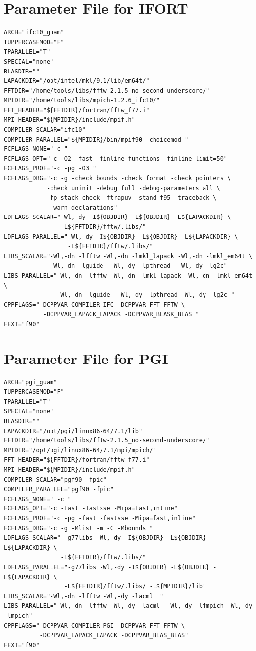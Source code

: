 \documentclass[a4paper,10pt]{report}
\begin{document}
\section{Parameter  File for IFORT}
\begin{verbatim}
ARCH="ifc10_guam"
TUPPERCASEMOD="F"
TPARALLEL="T"
SPECIAL="none"
BLASDIR=""
LAPACKDIR="/opt/intel/mkl/9.1/lib/em64t/"
FFTDIR="/home/tools/libs/fftw-2.1.5_no-second-underscore/"
MPIDIR="/home/tools/libs/mpich-1.2.6_ifc10/"
FFT_HEADER="${FFTDIR}/fortran/fftw_f77.i"
MPI_HEADER="${MPIDIR}/include/mpif.h"
COMPILER_SCALAR="ifc10"
COMPILER_PARALLEL="${MPIDIR}/bin/mpif90 -choicemod "
FCFLAGS_NONE="-c "
FCFLAGS_OPT="-c -O2 -fast -finline-functions -finline-limit=50"
FCFLAGS_PROF="-c -pg -O3 "
FCFLAGS_DBG="-c -g -check bounds -check format -check pointers \
            -check uninit -debug full -debug-parameters all \
            -fp-stack-check -ftrapuv -stand f95 -traceback \
             -warn declarations"
LDFLAGS_SCALAR="-Wl,-dy -I${OBJDIR} -L${OBJDIR} -L${LAPACKDIR} \
                -L${FFTDIR}/fftw/.libs/"
LDFLAGS_PARALLEL="-Wl,-dy -I${OBJDIR} -L${OBJDIR} -L${LAPACKDIR} \
                  -L${FFTDIR}/fftw/.libs/"
LIBS_SCALAR="-Wl,-dn -lfftw -Wl,-dn -lmkl_lapack -Wl,-dn -lmkl_em64t \
             -Wl,-dn -lguide  -Wl,-dy -lpthread  -Wl,-dy -lg2c"
LIBS_PARALLEL="-Wl,-dn -lfftw -Wl,-dn -lmkl_lapack -Wl,-dn -lmkl_em64t \
               -Wl,-dn -lguide  -Wl,-dy -lpthread -Wl,-dy -lg2c "
CPPFLAGS="-DCPPVAR_COMPILER_IFC -DCPPVAR_FFT_FFTW \
           -DCPPVAR_LAPACK_LAPACK -DCPPVAR_BLASK_BLAS "
FEXT="f90"
\end{verbatim}
\newpage
\section{Parameter File for PGI}
\begin{verbatim}
ARCH="pgi_guam"
TUPPERCASEMOD="F"
TPARALLEL="T"
SPECIAL="none"
BLASDIR=""
LAPACKDIR="/opt/pgi/linux86-64/7.1/lib"
FFTDIR="/home/tools/libs/fftw-2.1.5_no-second-underscore/"
MPIDIR="/opt/pgi/linux86-64/7.1/mpi/mpich/"
FFT_HEADER="${FFTDIR}/fortran/fftw_f77.i"
MPI_HEADER="${MPIDIR}/include/mpif.h"
COMPILER_SCALAR="pgf90 -fpic"
COMPILER_PARALLEL="pgf90 -fpic"
FCFLAGS_NONE=" -c "
FCFLAGS_OPT="-c -fast -fastsse -Mipa=fast,inline"
FCFLAGS_PROF="-c -pg -fast -fastsse -Mipa=fast,inline"
FCFLAGS_DBG="-c -g -Mlist -m -C -Mbounds "
LDFLAGS_SCALAR=" -g77libs -Wl,-dy -I${OBJDIR} -L${OBJDIR} -L${LAPACKDIR} \
                -L${FFTDIR}/fftw/.libs/"
LDFLAGS_PARALLEL="-g77libs -Wl,-dy -I${OBJDIR} -L${OBJDIR} -L${LAPACKDIR} \
                 -L${FFTDIR}/fftw/.libs/ -L${MPIDIR}/lib"
LIBS_SCALAR="-Wl,-dn -lfftw -Wl,-dy -lacml  "
LIBS_PARALLEL="-Wl,-dn -lfftw -Wl,-dy -lacml  -Wl,-dy -lfmpich -Wl,-dy -lmpich"
CPPFLAGS="-DCPPVAR_COMPILER_PGI -DCPPVAR_FFT_FFTW \
          -DCPPVAR_LAPACK_LAPACK -DCPPVAR_BLAS_BLAS"
FEXT="f90"
\end{verbatim}
\end{document}
